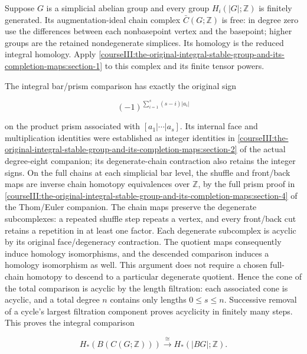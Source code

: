 Suppose \(G\) is a simplicial abelian group and every group \(H_i(|G|;\mathbb Z)\) is finitely generated. Its augmentation-ideal chain complex \(\bar C(G;\mathbb Z)\) is free: in degree zero use the differences between each nonbasepoint vertex and the basepoint; higher groups are the retained nondegenerate simplices. Its homology is the reduced integral homology. Apply \cref{courseIII:the-original-integral-stable-group-and-its-completion-maps:section-1} to this complex and its finite tensor powers.

The integral bar/prism comparison has exactly the original sign

\begin{equation}
(-1)^{\sum_{i=1}^s(s-i)|a_i|}
 \label{courseIII:the-original-integral-stable-group-and-its-completion-maps:eq:2.4}
\end{equation}

on the product prism associated with \([a_1|\cdots|a_s]\). Its internal face and multiplication identities were established as integer identities in \cref{courseIII:the-original-integral-stable-group-and-its-completion-maps:section-2} of the actual degree-eight companion; its degenerate-chain contraction also retains the integer signs. On the full chains at each simplicial bar level, the shuffle and front/back maps are inverse chain homotopy equivalences over \(\mathbb Z\), by the full prism proof in \cref{courseIII:the-original-integral-stable-group-and-its-completion-maps:section-4} of the Thom/Euler companion. The chain maps preserve the degenerate subcomplexes: a repeated shuffle step repeats a vertex, and every front/back cut retains a repetition in at least one factor. Each degenerate subcomplex is acyclic by its original face/degeneracy contraction. The quotient maps consequently induce homology isomorphisms, and the descended comparison induces a homology isomorphism as well. This argument does not require a chosen full-chain homotopy to descend to a particular degenerate quotient. Hence the cone of the total comparison is acyclic by the length filtration: each associated cone is acyclic, and a total degree \(n\) contains only lengths \(0\leq s\leq n\). Successive removal of a cycle's largest filtration component proves acyclicity in finitely many steps. This proves the integral comparison

\begin{equation}
H_*(B(C(G;\mathbb Z)))\xrightarrow{\cong}
 H_*(|BG|;\mathbb Z).
 \label{courseIII:the-original-integral-stable-group-and-its-completion-maps:eq:2.5}
\end{equation}

